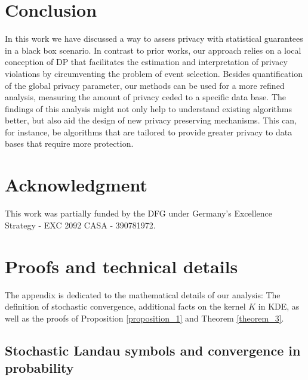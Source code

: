 \documentclass[conference]{IEEEtran}
\begin{document}
\section*{Conclusion}

In this work we have discussed a way to assess privacy with statistical guarantees in a black box scenario. In contrast to prior works, our approach relies on a local conception of DP that facilitates the estimation and interpretation of privacy violations by circumventing the problem of event selection. Besides quantification of the global privacy parameter, our methods can be used for a more refined analysis, measuring the amount of privacy ceded to a specific data base. 
The findings of this analysis might not only help to understand existing algorithms better, but also aid the design of new privacy preserving mechanisms. This can, for instance, be algorithms that are tailored to provide  greater privacy to data bases that require more protection.




\section*{Acknowledgment}

This work was partially funded by the DFG under Germany's Excellence Strategy - EXC 2092 CASA - 390781972.












\newpage 


\begin{small}

\end{small} 

\appendices





\section{Proofs and technical details} \label{App_1}

The appendix is dedicated to the mathematical details of our analysis: The definition of stochastic convergence, additional facts on the kernel $K$ in KDE, as well as the proofs of Proposition \ref{proposition_1} and Theorem \ref{theorem_3}.

\subsection{Stochastic Landau symbols and convergence in probability} \label{Appendix_convergence}
\end{document}
